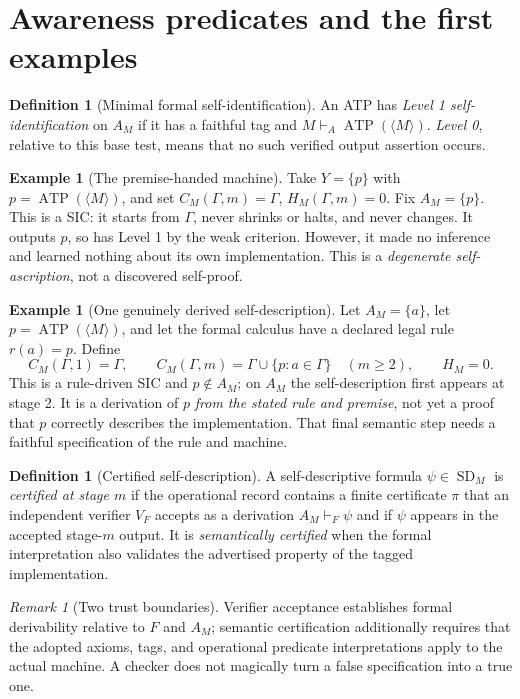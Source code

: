 \documentclass[11pt,letterpaper]{article}
\theoremstyle{definition}\newtheorem{definition}[theorem]{Definition}\newtheorem{example}[theorem]{Example}\newtheorem{protocol}[theorem]{Protocol}\newtheorem{question}[theorem]{Open Problem}
\theoremstyle{remark}\newtheorem{remark}[theorem]{Remark}
\newcommand{\SD}{\operatorname{SD}}
\newcommand{\Mtag}{\langle M\rangle}
\begin{document}
\section{Awareness predicates and the first examples}
\begin{definition}[Minimal formal self-identification]
An ATP has \emph{Level 1 self-identification} on $A_M$ if it has a faithful tag and $M\vdash_A\operatorname{ATP}(\Mtag)$. \emph{Level 0}, relative to this base test, means that no such verified output assertion occurs.
\end{definition}
\begin{example}[The premise-handed machine]\label{ex:handed}
Take $Y=\{p\}$ with $p=\operatorname{ATP}(\Mtag)$, and set $C_M(\Gamma,m)=\Gamma$, $H_M(\Gamma,m)=0$. Fix $A_M=\{p\}$. This is a SIC: it starts from $\Gamma$, never shrinks or halts, and never changes. It outputs $p$, so has Level 1 by the weak criterion. However, it made no inference and learned nothing about its own implementation. This is a \emph{degenerate self-ascription}, not a discovered self-proof.
\end{example}
\begin{example}[One genuinely derived self-description]\label{ex:derived}
Let $A_M=\{a\}$, let $p=\operatorname{ATP}(\Mtag)$, and let the formal calculus have a declared legal rule $r(a)=p$. Define
\[
C_M(\Gamma,1)=\Gamma,\qquad
C_M(\Gamma,m)=\Gamma\cup\{p:a\in\Gamma\}\quad(m\ge2),\qquad H_M=0.
\]
This is a rule-driven SIC and $p\notin A_M$; on $A_M$ the self-description first appears at stage 2. It is a derivation of $p$ \emph{from the stated rule and premise}, not yet a proof that $p$ correctly describes the implementation. That final semantic step needs a faithful specification of the rule and machine.
\end{example}
\begin{definition}[Certified self-description]
A self-descriptive formula $\psi\in\SD_M$ is \emph{certified at stage $m$} if the operational record contains a finite certificate $\pi$ that an independent verifier $V_F$ accepts as a derivation $A_M\vdash_F\psi$ and if $\psi$ appears in the accepted stage-$m$ output. It is \emph{semantically certified} when the formal interpretation also validates the advertised property of the tagged implementation.
\end{definition}
\begin{remark}[Two trust boundaries]
Verifier acceptance establishes formal derivability relative to $F$ and $A_M$; semantic certification additionally requires that the adopted axioms, tags, and operational predicate interpretations apply to the actual machine. A checker does not magically turn a false specification into a true one.
\end{remark}
\end{document}
